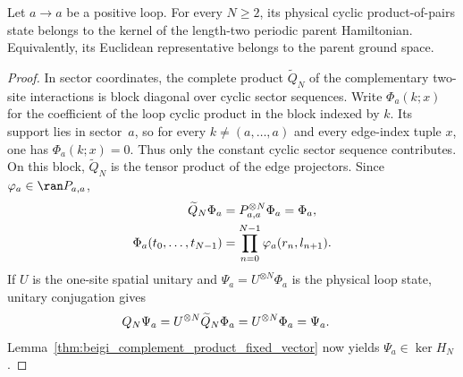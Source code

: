 \begin{lemma}
    \label{thm:beigi_loop_product_state_ground_state}
    \leanok
    Let $a\to a$ be a positive loop. For every $N\geq2$, its physical
    cyclic product-of-pairs state belongs to the kernel of the length-two
    periodic parent Hamiltonian. Equivalently, its Euclidean representative
    belongs to the parent ground space.
\end{lemma}

\begin{proof}\leanok
    In sector coordinates, the complete product $\widetilde Q_N$ of the
    complementary two-site interactions is block diagonal over cyclic sector
    sequences. Write $\Phi_a(k;x)$ for the coefficient of the loop cyclic
    product in the block indexed by $k$. Its support lies in sector~$a$, so
    for every $k\ne(a,\ldots,a)$ and every edge-index tuple $x$, one has
    $\Phi_a(k;x)=0$. Thus only the constant cyclic sector sequence
    contributes. On this block, $\widetilde Q_N$ is the tensor product of the
    edge projectors. Since $\varphi_a\in\ran P_{a,a}$,
    \begin{align}
        \widetilde Q_N\Phi_a
         & =
        P_{a,a}^{\otimes N}\Phi_a =
        \Phi_a, \notag \\
        \Phi_a(t_0,\ldots,t_{N-1})
         & =
        \prod_{n=0}^{N-1}\varphi_a(r_n,l_{n+1}). \notag
    \end{align}
    If $U$ is the one-site spatial unitary and
    $\Psi_a=U^{\otimes N}\Phi_a$ is the physical loop state, unitary
    conjugation gives
    \begin{align}
        Q_N\Psi_a
         & =
        U^{\otimes N}\widetilde Q_N\Phi_a =
        U^{\otimes N}\Phi_a =
        \Psi_a. \notag
    \end{align}
    Lemma~\ref{thm:beigi_complement_product_fixed_vector} now yields
    $\Psi_a\in\ker H_N$.
\end{proof}

